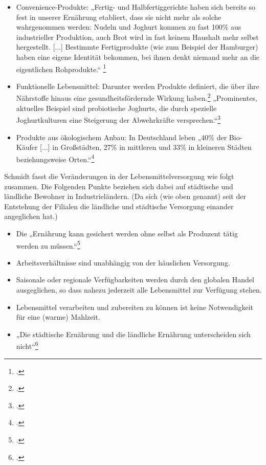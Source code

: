 \documentclass{scrartcl}
\begin{document}
 \begin{itemize}
\item Convenience-Produkte: „Fertig- und Halbfertiggerichte haben sich bereits so fest in unserer Ernährung etabliert, dass sie nicht mehr als solche wahrgenommen werden: Nudeln und Joghurt kommen zu fast 100\% aus industrieller Produktion, auch Brot wird in fast keinem Haushalt mehr selbst hergestellt. [...] Bestimmte Fertigprodukte (wie zum Beispiel der Hamburger)
haben eine eigene Identität bekommen, bei ihnen denkt niemand mehr an die eigentlichen Rohprodukte.“ \footcite{Escher2003EssenKultur}
\item Funktionelle Lebensmittel: Darunter werden Produkte definiert, die über ihre Nährstoffe hinaus eine gesundheitsfördernde Wirkung haben.\footcites[Vgl.][S.5]{Heasman1958-2001TheProfits} „Prominentes, aktuelles Beispiel sind probiotische Joghurts, die durch spezielle Joghurtkulturen eine Steigerung der Abwehrkräfte versprechen.“\footcite[S.14]{Stierand2008StadtLebensmittel}
\item Produkte aus ökologischem Anbau: In Deutschland leben „40\% der Bio-Käufer [...] in Großstädten, 27\% in mittleren und 33\% in kleineren Städten beziehungsweise Orten.“\footcite[S.14]{Stierand2008StadtLebensmittel}
\end{itemize}
Schmidt fasst die Veränderungen in der Lebensmittelversorgung wie folgt zusammen. Die Folgenden Punkte beziehen sich dabei auf städtische und ländliche Bewohner in Industrieländern. (Da sich (wie oben genannt) seit der Entstehung der Filialen die ländliche und städtische Versorgung einander angeglichen hat.)

\begin{itemize}
\item Die „Ernährung kann gesichert werden ohne selbst als Produzent tätig werden zu
müssen.“\footcite[S.20]{SchmidtDieVon}
\item Arbeitsverhältnisse sind unabhängig von der häuslichen Versorgung.
\item Saisonale oder regionale Verfügbarkeiten werden durch den globalen Handel
ausgeglichen, so dass nahezu jederzeit alle Lebensmittel zur Verfügung stehen.
\item Lebensmittel verarbeiten und zubereiten zu können ist keine Notwendigkeit für
eine (warme) Mahlzeit.
\item „Die städtische Ernährung und die ländliche Ernährung unterscheiden sich nicht“\footcite[S.20]{SchmidtDieVon}
\end{itemize}
\end{document}
